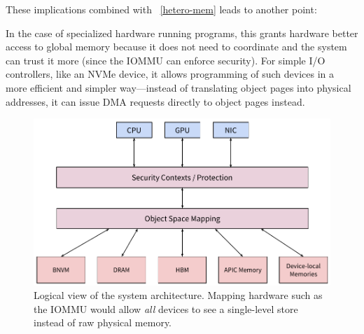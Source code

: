 {        These implications combined with \observation~\ref{hetero-mem} leads to another point:


        In the case of specialized hardware running programs, this grants hardware better access to global
        memory because it does not need to coordinate and the system can trust it more (since the IOMMU can
        enforce security). For simple I/O controllers, like an NVMe device, it allows programming of such
        devices in a more efficient and simpler way---instead of translating object pages into physical
        addresses, it can issue DMA requests directly to object pages instead.


        \begin{figure}
            \centering
            \includegraphics[width=\linewidth]{fig/log_sys_arch}
            \caption{Logical view of the system architecture. Mapping hardware such as the IOMMU would allow
                \emph{all} devices to see a single-level store instead of raw physical memory.}
            \label{fig:log_sys_arch}
        \end{figure}


}
